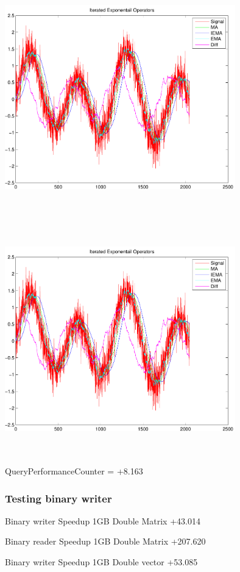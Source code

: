 \documentclass[9pt]{article}
\theoremstyle{plain}
\theoremstyle{definition}
\theoremstyle{remark}
\numberwithin{equation}{section}
\begin{document}
\includegraphics[width=10.0cm,height=10.0cm]{IteratedExponentailOperators.pdf}

\includegraphics[width=10.0cm,height=10.0cm]{IteratedExponentailOperators.pdf}

QueryPerformanceCounter  =  +8.163
\subsubsection{Testing binary writer}
Binary writer Speedup 1GB Double Matrix +43.014

Binary reader Speedup 1GB Double Matrix +207.620

Binary writer Speedup 1GB Double vector +53.085
\end{document}

